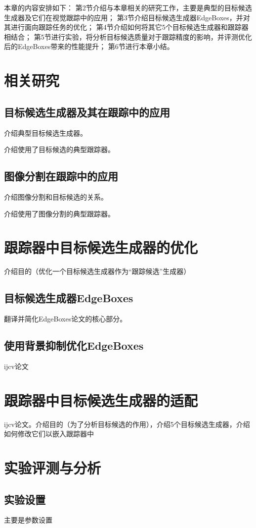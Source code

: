 本章的内容安排如下：
第2节介绍与本章相关的研究工作，主要是典型的目标候选生成器及它们在视觉跟踪中的应用；
第3节介绍目标候选生成器EdgeBoxes，并对其进行面向跟踪任务的优化；
第4节介绍如何将其它5个目标候选生成器和跟踪器相结合；
第5节进行实验，将分析目标候选质量对于跟踪精度的影响，并评测优化后的EdgeBoxes带来的性能提升；
第6节进行本章小结。



\section{相关研究}
\subsection{目标候选生成器及其在跟踪中的应用}
介绍典型目标候选生成器。

介绍使用了目标候选的典型跟踪器。
\subsection{图像分割在跟踪中的应用}
介绍图像分割和目标候选的关系。

介绍使用了图像分割的典型跟踪器。


\section{跟踪器中目标候选生成器的优化}
介绍目的（优化一个目标候选生成器作为``跟踪候选''生成器）
\subsection{目标候选生成器EdgeBoxes}
翻译并简化EdgeBoxes论文的核心部分。
\subsection{使用背景抑制优化EdgeBoxes}
ijcv论文


\section{跟踪器中目标候选生成器的适配}
ijcv论文。介绍目的（为了分析目标候选的作用），介绍5个目标候选生成器，介绍如何修改它们以嵌入跟踪器中




\section{实验评测与分析}
\subsection{实验设置}
主要是参数设置

